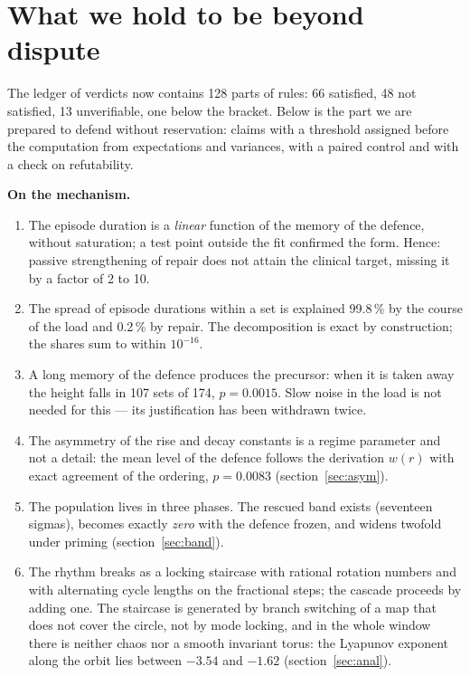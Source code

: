 \section{What we hold to be beyond dispute}\label{sec:solid}
The ledger of verdicts now contains 128 parts of rules: 66 satisfied, 48 not satisfied, 13 unverifiable, one below the bracket. Below is the part we are prepared to defend without reservation: claims with a threshold assigned before the computation from expectations and variances, with a paired control and with a check on refutability.

\textbf{On the mechanism.}
\begin{enumerate}[leftmargin=1.3em,itemsep=2pt,topsep=2pt]
\item The episode duration is a \emph{linear} function of the memory of the defence, without saturation; a test point outside the fit confirmed the form. Hence: passive strengthening of repair does not attain the clinical target, missing it by a factor of 2 to 10.
\item The spread of episode durations within a set is explained 99.8\,\% by the course of the load and 0.2\,\% by repair. The decomposition is exact by construction; the shares sum to within $10^{-16}$.
\item A long memory of the defence produces the precursor: when it is taken away the height falls in 107 sets of 174, $p=0.0015$. Slow noise in the load is not needed for this --- its justification has been withdrawn twice.
\item The asymmetry of the rise and decay constants is a regime parameter and not a detail: the mean level of the defence follows the derivation $w(r)$ with exact agreement of the ordering, $p=0.0083$ (section~\ref{sec:asym}).
\item The population lives in three phases. The rescued band exists (seventeen sigmas), becomes exactly \emph{zero} with the defence frozen, and widens twofold under priming (section~\ref{sec:band}).
\item The rhythm breaks as a locking staircase with rational rotation numbers and with alternating cycle lengths on the fractional steps; the cascade proceeds by adding one. The staircase is generated by branch switching of a map that does not cover the circle, not by mode locking, and in the whole window there is neither chaos nor a smooth invariant torus: the Lyapunov exponent along the orbit lies between $-3.54$ and $-1.62$ (section~\ref{sec:anal}).

\end{enumerate}
